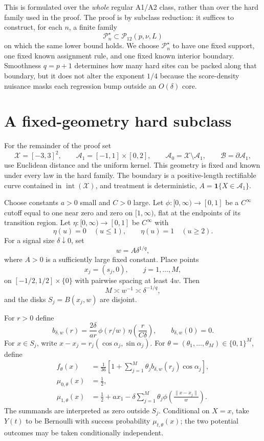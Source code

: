 \documentclass[11pt]{article}
\newcommand{\cB}{\mathcal B}
\newcommand{\cX}{\mathcal X}
\newcommand{\cA}{\mathcal A}
\newcommand{\1}{\mathbf 1}
\begin{document}
This is formulated over the \emph{whole} regular A1/A2 class, rather than over the hard family used in the proof.  The proof is by subclass reduction: it suffices to construct, for each $n$, a finite family
\[
\mathcal P_n^\star\subset\mathcal P_{12}(p,\nu,L)
\]
on which the same lower bound holds.  We choose $\mathcal P_n^\star$ to have one fixed support, one fixed known assignment rule, and one fixed known interior boundary.  Smoothness $q=p+1$ determines how many hard sites can be packed along that boundary, but it does not alter the exponent $1/4$ because the score-density nuisance masks each regression bump outside an $O(\delta)$ core.

\section{A fixed-geometry hard subclass}

For the remainder of the proof set
\[
\cX=[-3,3]^2,
\qquad
\cA_1=[-1,1]\times[0,2],
\qquad
\cA_0=\cX\setminus\cA_1,
\qquad
\cB=\partial\cA_1,
\]
use Euclidean distance and the uniform kernel.  This geometry is fixed and known under every law in the hard family.  The boundary is a positive-length rectifiable curve contained in $\operatorname{int}(\cX)$, and treatment is deterministic, $A=\1\{X\in\cA_1\}$.

Choose constants $a>0$ small and $C>0$ large.  Let $\phi:[0,\infty)\to[0,1]$ be a $C^\infty$ cutoff equal to one near zero and zero on $[1,\infty)$, flat at the endpoints of its transition region.  Let $\eta:[0,\infty)\to[0,1]$ be $C^\infty$ with
\[
\eta(u)=0\quad(u\le1),
\qquad
\eta(u)=1\quad(u\ge2).
\]
For a signal size $\delta\downarrow0$, set
\[
w=A\delta^{1/q},
\]
where $A>0$ is a sufficiently large fixed constant.  Place points
\[
x_j=(s_j,0),\qquad j=1,\ldots,M,
\]
on $[-1/2,1/2]\times\{0\}$ with pairwise spacing at least $4w$.  Then
\[
M\asymp w^{-1}\asymp\delta^{-1/q},
\]
and the disks $S_j=B(x_j,w)$ are disjoint.

For $r>0$ define
\[
b_{\delta,w}(r)
=
\frac{2\delta}{a r}\,
\phi(r/w)\,
\eta\!\left(\frac{r}{C\delta}\right),
\qquad b_{\delta,w}(0)=0.
\]
For $x\in S_j$, write $x-x_j=r_j(\cos\alpha_j,\sin\alpha_j)$.  For
$\theta=(\theta_1,\ldots,\theta_M)\in\{0,1\}^M$, define
\begin{align}
 f_\theta(x)
 &=\frac1{36}\left[
 1+\sum_{j=1}^M \theta_j b_{\delta,w}(r_j)\cos\alpha_j
 \right],                                                     \label{eq:density}\\
 \mu_{0,\theta}(x)&=\frac12,                                  \label{eq:mu0}\\
 \mu_{1,\theta}(x)
 &=\frac12+a x_1
 -\delta\sum_{j=1}^M\theta_j
 \phi\!\left(\frac{\|x-x_j\|}{w}\right).                   \label{eq:mu1}
\end{align}
The summands are interpreted as zero outside $S_j$.  Conditional on $X=x$, take $Y(t)$ to be Bernoulli with success probability $\mu_{t,\theta}(x)$; the two potential outcomes may be taken conditionally independent.
\end{document}
